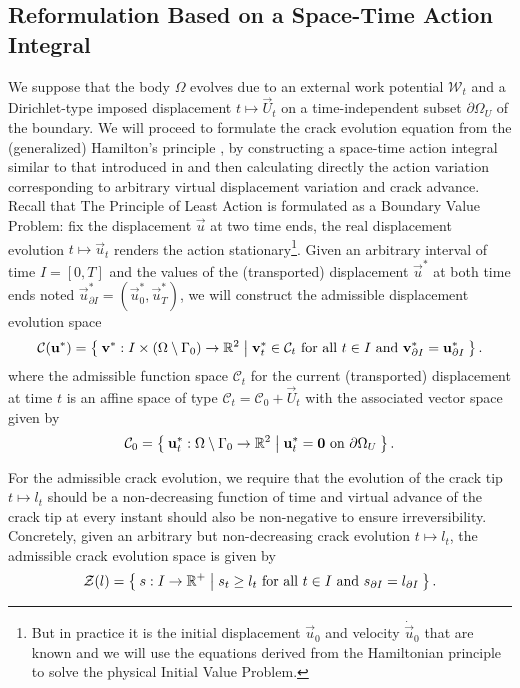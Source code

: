 \subsection{Reformulation Based on a Space-Time Action Integral} \label{sec:reformulationtheta}
We suppose that the body $\Omega$ evolves due to an external work potential $\mathcal{W}_t$ and a Dirichlet-type imposed displacement $t\mapsto\vec{U}_t$ on a time-independent subset $\partial\Omega_U$ of the boundary. We will proceed to formulate the crack evolution equation from the (generalized) Hamilton's principle \cite{Hamilton:1834}, by constructing a space-time action integral similar to that introduced in \cite{Adda-BediaAriasAmarLund:1999} and then calculating directly the action variation corresponding to arbitrary virtual displacement variation and crack advance. Recall that The Principle of Least Action is formulated as a Boundary Value Problem: fix the displacement $\vec{u}$ at two time ends, the real displacement evolution $t\mapsto\vec{u}_t$ renders the action stationary\footnote{But in practice it is the initial displacement $\vec{u}_0$ and velocity $\dot{\vec{u}}_0$ that are known and we will use the equations derived from the Hamiltonian principle to solve the physical Initial Value Problem.}. Given an arbitrary interval of time $I=[0,T]$ and the values of the (transported) displacement $\vec{u}^*$ at both time ends noted $\vec{u}^*_{\partial I}=(\vec{u}^*_0,\vec{u}^*_T)$, we will construct the admissible displacement evolution space
\begin{equation} \label{eq:Cu}
\mathcal{C}(\vec{u}^*)=\set{\vec{v}^*:I\times(\domaini)\to\mathbb{R}^2|\vec{v}_t^*\in\mathcal{C}_t\text{ for all $t\in I$ and }\vec{v}^*_{\partial I}=\vec{u}^*_{\partial I}}.
\end{equation}
where the admissible function space $\mathcal{C}_t$ for the current (transported) displacement at time $t$ is an affine space of type $\mathcal{C}_t=\mathcal{C}_0+\vec{U}_t$ with the associated vector space given by
\[
\mathcal{C}_0=\set{\vec{u}^*_t:\domaini\to\mathbb{R}^2|\vec{u}^*_t=\vec{0}\text{ on }\partial\Omega_U}.
\]

For the admissible crack evolution, we require that the evolution of the crack tip $t\mapsto l_t$ should be a non-decreasing function of time and virtual advance of the crack tip at every instant should also be non-negative to ensure irreversibility. Concretely, given an arbitrary but non-decreasing crack evolution $t\mapsto l_t$, the admissible crack evolution space is given by
\begin{equation} \label{eq:Dl}
\mathcal{Z}(l)=\Set{s:I\to\mathbb{R}^+|s_t\geq l_t\text{ for all $t\in I$ and }s_{\partial I}=l_{\partial I}}.
\end{equation}

